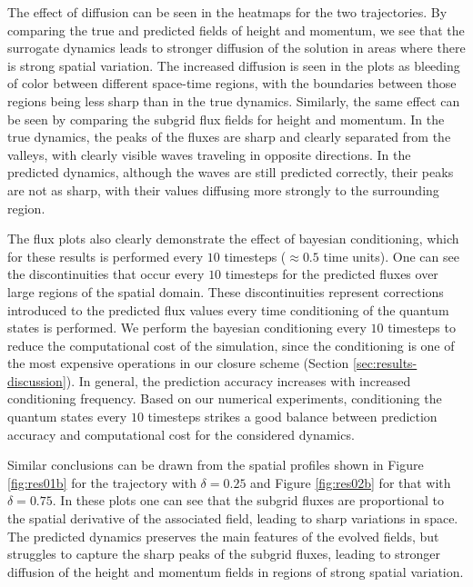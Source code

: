\documentclass[letterpaper,10pt,3p,preprint]{elsarticle}
\begin{document}
The effect of diffusion can be seen in the heatmaps for the
two trajectories.
By comparing the true and predicted fields of height and momentum,
we see that the surrogate dynamics leads to stronger diffusion of
the solution in areas where there is strong spatial variation.
The increased diffusion is seen in the plots as bleeding of color
between different space-time regions, with the boundaries between
those regions being less sharp than in the true dynamics.
Similarly, the same effect can be seen by comparing the subgrid flux
fields for height and momentum.
In the true dynamics, the peaks of the fluxes are sharp and clearly
separated from the valleys, with clearly visible waves traveling in
opposite directions.
In the predicted dynamics, although the waves are still predicted
correctly, their peaks are not as sharp, with their values
diffusing more strongly to the surrounding region.

The flux plots also clearly demonstrate the effect of bayesian
conditioning, which for these results is performed every
$10$ timesteps ($\approx 0.5$ time units).
One can see the discontinuities that occur every $10$ timesteps
for the predicted fluxes over large regions of the spatial domain.
These discontinuities represent corrections introduced to the predicted
flux values every time conditioning of the quantum states is performed.
We perform the bayesian conditioning every $10$
timesteps to reduce the computational cost of the simulation,
since the conditioning is one of the most expensive operations
in our closure scheme
(Section \ref{sec:results-discussion}).
In general, the prediction accuracy
increases with increased conditioning frequency.
Based on our numerical experiments,
conditioning the quantum states every $10$ timesteps
strikes a good balance between prediction accuracy
and computational cost for the considered dynamics.

Similar conclusions can be drawn from the spatial profiles shown in
Figure \ref{fig:res01b} for the trajectory with $\delta=0.25$
and Figure \ref{fig:res02b} for that with $\delta=0.75$.
In these plots one can see that the subgrid fluxes are proportional
to the spatial derivative of the associated field, leading to sharp
variations in space.
The predicted dynamics preserves the main features of the evolved
fields, but struggles to capture the sharp peaks of the
subgrid fluxes, leading to stronger diffusion of the height and momentum
fields in regions of strong spatial variation.
\end{document}
